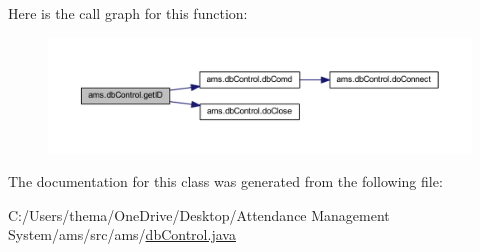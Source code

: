 Here is the call graph for this function\+:\nopagebreak
\begin{figure}[H]
\begin{center}
\leavevmode
\includegraphics[width=350pt]{classams_1_1db_control_ac130c7d3b8e1b37cfcacc3f05b9562d2_cgraph}
\end{center}
\end{figure}


The documentation for this class was generated from the following file\+:\begin{DoxyCompactItemize}
\item 
C\+:/\+Users/thema/\+One\+Drive/\+Desktop/\+Attendance Management System/ams/src/ams/\mbox{\hyperlink{db_control_8java}{db\+Control.\+java}}\end{DoxyCompactItemize}
